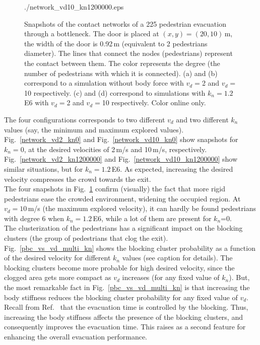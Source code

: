 \documentclass[preprint,12pt]{elsarticle}
\begin{document}
\begin{figure}[!htbp]
{{./network_vd10_kn1200000.eps}\label{network_vd10_kn1200000}}\\

\caption[width=0.47\columnwidth]{Snapshots of the contact networks of a 225
pedestrian evacuation through a bottleneck. The door is placed at
$(x,y)=(20,10)\,$m, the width of the door is 0.92$\,$m (equivalent to 2
pedestrian\textsc{}s diameter). The lines that connect the nodes
(pedestrians) represent the contact between them. The color represents the
degree (the number of pedestrians with which it is connected). (a) and (b)
correspond to a simulation without body force with $v_d=$2 and $v_d=$10
respectively. (c) and (d) correspond to simulations with $k_n=1.2\,$E6 with
$v_d=$2 and $v_d=$10 respectively. Color online only.}
\label{network_bottleneck}
 \end{figure}

The four configurations corresponds to two different $v_d$ and two different
$k_n$ values (say, the  minimum and maximum explored values).
Fig.~\ref{network_vd2_kn0} and Fig.~\ref{network_vd10_kn0} show snapshots for
$k_n=0$, at the desired velocities of 2$\,$m/s and 10$\,$m/s, respectively.
Fig.~\ref{network_vd2_kn1200000} and Fig.~\ref{network_vd10_kn1200000} show
similar situations, but for  $k_n=1.2\,$E6. As expected, increasing the desired
velocity compresses the crowd towards the exit. \\

The four snapshots in Fig.~\ref{network_bottleneck} confirm (visually) the fact
that more rigid pedestrians ease the crowded environment, widening the occupied
region. At $v_d=10\,$m/s (the maximum explored velocity), it can hardly be found
pedestrians with degree 6 when $k_n=1.2\,$E6, while a lot of them are present
for $k_n$=0.\\

The clusterization of the pedestrians has a significant impact on the blocking
clusters (the group of pedestrians that clog the exit).
Fig.~\ref{pbc_vs_vd_multi_kn} shows the blocking cluster probability as a
function of the desired velocity for different $k_n$ values (see caption for
details). The blocking clusters become more probable for high desired velocity,
since the clogged area gets more compact as $v_d$ increases (for any fixed value
of $k_n$). But, the most remarkable fact in Fig.~\ref{pbc_vs_vd_multi_kn} is
that increasing the body stiffness reduces the blocking cluster probability for
any fixed value of $v_d$. Recall from Ref.~\cite{dorso_2005} that the evacuation
time is controlled by the blocking. Thus, increasing the body stiffness affects
the presence of the blocking clusters, and consequently improves the evacuation
time. This raises as a second feature for enhancing the overall evacuation
performance. \\
\end{document}
